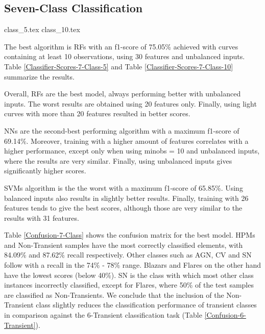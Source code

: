 \documentclass[a4paper,fleqn,usenatbib]{mnras}
\begin{document}
\subsection{Seven-Class Classification}

{class_5.tex}
{class_10.tex}

The best algorithm is RFs with an f1-score of 75.05\% achieved with 
curves containing at least 10 observations, using 30 features and
unbalanced inputs. 
Table \ref{Classifier-Scores-7-Class-5} and Table
\ref{Classifier-Scores-7-Class-10} summarize the results.

Overall, RFs are the best model, always performing better with unbalanced
inputs.  
The worst results are obtained using 20 features only.
Finally, using light curves with more than 20 features resulted in
better scores.

NNs are the second-best performing algorithm with a maximum f1-score of
69.14\%. 
Moreover, training with a higher amount of features correlates with a
higher performance, except only when using min\textunderscore obs = 10
and unbalanced inputs, where the results are very similar. 
Finally, using unbalanced inputs gives significantly higher scores.  

SVMs algorithm is the the worst with a maximum f1-score of 65.85\%. 
Using balanced inputs also results in slightly better results. 
Finally, training with 26 features tends to give the best scores,
although those are very similar to the results with 31 features.  

Table \ref{Confusion-7-Class} shows the confusion matrix for the best
model. 
HPMs and Non-Transient samples have the most correctly classified elements, with 84.09\%
and 87.62\% recall respectively. 
Other classes such as AGN, CV and SN follow with a recall in the 74\%
- 78\% range. 
Blazars and Flares on the other hand have the lowest scores (below
40\%). 
SN is the class with which most other class instances incorrectly
classified, except for Flares, where 50\% of the test samples are
classified as Non-Transients. 
We conclude that the inclusion of the Non-Transient class slightly
reduces the  classification performance of transient classes in
comparison against the  6-Transient classification task
(Table \ref{Confusion-6-Transient}).  
\end{document}
